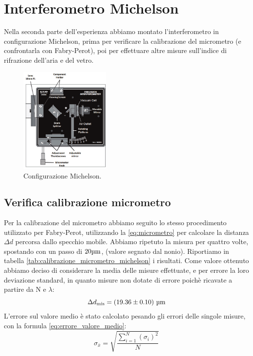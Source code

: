 \documentclass[letterpaper,12pt]{article}
\begin{document}
\newpage
\section{Interferometro Michelson}
Nella seconda parte dell'esperienza abbiamo montato l'interferometro in configurazione Michelson, prima per verificare 
la calibrazione del micrometro (e confrontarla con Fabry-Perot), poi per effettuare altre misure sull'indice di rifrazione
dell'aria e del vetro.
\begin{figure}[h]
    \centering
    \includegraphics[width=0.4\textwidth]{Michelson_aria.png}
    \caption{Configurazione Michelson.}
    \label{fig:michelson config}
\end{figure}

\subsection{Verifica calibrazione micrometro}
Per la calibrazione del micrometro abbiamo seguito lo stesso procedimento utilizzato per Fabry-Perot, 
utilizzando la  \ref{eq:micrometro} per calcolare la distanza $\Delta d$ percorsa dallo specchio mobile. Abbiamo ripetuto
la misura per quattro volte, spostando con un passo di $20 \text{\SIUnitSymbolMicro m}$, (valore segnato 
dal nonio). Riportiamo in tabella \ref{tab:calibrazione_micrometro_michelson} i risultati. Come valore ottenuto
abbiamo deciso di considerare la media delle misure effettuate, e per errore la loro deviazione standard, in quanto 
misure non dotate di errore poichè ricavate a partire da N e $\lambda$:
$$\Delta d_\text{mis} = (19.36 \pm0.10)\ \text{\SIUnitSymbolMicro m} $$
L'errore sul valore medio è stato calcolato pesando 
gli errori delle singole misure, con la formula \ref{eq:errore_valore_medio}:
\begin{equation}
    \sigma_{\bar{x}} = \sqrt{\frac{\sum_{i=1}^{N} (\sigma_i)^2}{N}}
    \label{eq:errore_valore_medio}
\end{equation}
\end{document}
